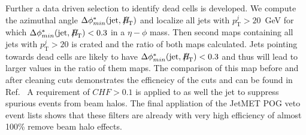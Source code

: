 
Further a data driven selection to identify dead cells is developed. We compute the azimuthal angle $\Delta \phi^*_{min} (\textrm{jet},\htmiss)$ and localize all jets with $p_\textrm{T}^j>20$~GeV for which $\Delta \phi^*_{min} (\textrm{jet},\htmiss)<0.3$ in a $\eta - \phi$ mass. Then second maps containing all jets with  $p_\textrm{T}^j>20$ is crated and the ratio of both maps calculated.  Jets pointing towards dead cells are likely to have $\Delta \phi^*_{min} (\textrm{jet},\htmiss)<0.3$ and thus will lead to larger values in the ratio of them maps. The comparison of this map before and after cleaning cuts demonstrates the efficneicy of the cuts and can be found in Ref.~\cite{alphaTnote} A requirement of $CHF > 0.1$ is applied to as well the jet to suppress spurious events from beam halos. The final appliation of the JetMET POG veto event lists shows that these filters are already with very high efficiency of almost 100\% remove beam halo effects.

